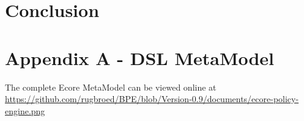 \documentclass{"The Road to a Building Automation DSL through MDD"}
\begin{document}
\section{Conclusion}\label{sec:conclusion}


{}


\section{Appendix A - DSL MetaModel}\label{app:a-metamodel}
The complete Ecore MetaModel can be viewed online at
\url{https://github.com/rugbroed/BPE/blob/Version-0.9/documents/ecore-policy-engine.png}





\end{document}
